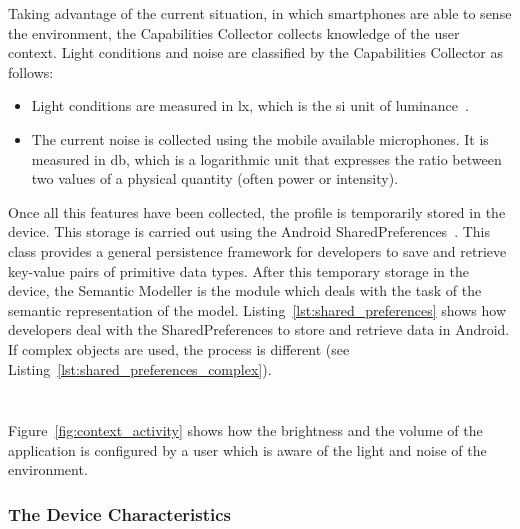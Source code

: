Taking advantage of the current situation, in which smartphones are able to sense
the environment, the Capabilities Collector collects knowledge of the user context.
Light conditions and noise are classified by the Capabilities Collector as follows:

\begin{itemize}
 \item Light conditions are measured in \ac{lx}, which is the \ac{si} unit of 
 luminance~\citep{lux}.
 
 \item The current noise is collected using the mobile available microphones. It
 is measured in \ac{db}, which is a logarithmic unit that expresses the ratio
 between two values of a physical quantity (often power or intensity).
\end{itemize}

Once all this features have been collected, the profile is temporarily stored in 
the device. This storage is carried out using the Android 
SharedPreferences~\citep{shared_preferences}.
This class provides a general persistence framework for developers to save and
retrieve key-value pairs of primitive data types. After this temporary storage
in the device, the Semantic Modeller is the module which deals with the task of
the semantic representation of the model. Listing~\ref{lst:shared_preferences}
shows how developers deal with the SharedPreferences to store and retrieve data
in Android. If complex objects are used, the process is different (see
Listing~\ref{lst:shared_preferences_complex}).

\inputminted[linenos=true, fontsize=\footnotesize, frame=lines]{java}{4_system_architecture/shared_preferences.java}

\inputminted[linenos=true, fontsize=\footnotesize, frame=lines]{java}{4_system_architecture/shared_preferences_complex.java}

Figure~\ref{fig:context_activity} shows how the brightness and the volume of
the application is configured by a user which is aware of the light and noise
of the environment.

\subsubsection{The Device Characteristics}
\label{sec:device_characteristics}

